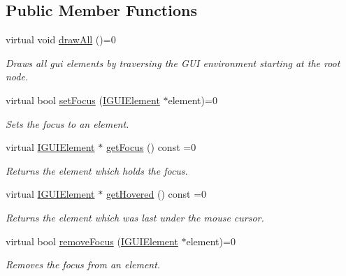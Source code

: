 \subsection*{Public Member Functions}
\begin{DoxyCompactItemize}
\item 
\mbox{\label{classirr_1_1gui_1_1IGUIEnvironment_aa6ba29bbf3121a5954cfa5a9ca72982f}} 
virtual void \hyperlink{classirr_1_1gui_1_1IGUIEnvironment_aa6ba29bbf3121a5954cfa5a9ca72982f}{draw\+All} ()=0
\begin{DoxyCompactList}\small\item\em Draws all gui elements by traversing the G\+UI environment starting at the root node. \end{DoxyCompactList}\item 
virtual bool \hyperlink{classirr_1_1gui_1_1IGUIEnvironment_a2bfe9985ae1a2f379e708fce86902cea}{set\+Focus} (\hyperlink{classirr_1_1gui_1_1IGUIElement}{I\+G\+U\+I\+Element} $\ast$element)=0
\begin{DoxyCompactList}\small\item\em Sets the focus to an element. \end{DoxyCompactList}\item 
virtual \hyperlink{classirr_1_1gui_1_1IGUIElement}{I\+G\+U\+I\+Element} $\ast$ \hyperlink{classirr_1_1gui_1_1IGUIEnvironment_a624c047cb88a5d3e3e0d17a42a627335}{get\+Focus} () const =0
\begin{DoxyCompactList}\small\item\em Returns the element which holds the focus. \end{DoxyCompactList}\item 
virtual \hyperlink{classirr_1_1gui_1_1IGUIElement}{I\+G\+U\+I\+Element} $\ast$ \hyperlink{classirr_1_1gui_1_1IGUIEnvironment_a00fa645d517a276553b78fc1d0e78591}{get\+Hovered} () const =0
\begin{DoxyCompactList}\small\item\em Returns the element which was last under the mouse cursor. \end{DoxyCompactList}\item 
virtual bool \hyperlink{classirr_1_1gui_1_1IGUIEnvironment_ab2100753b415a9950d95572d4623bf46}{remove\+Focus} (\hyperlink{classirr_1_1gui_1_1IGUIElement}{I\+G\+U\+I\+Element} $\ast$element)=0
\begin{DoxyCompactList}\small\item\em Removes the focus from an element. \end{DoxyCompactList}\item 

\end{DoxyCompactItemize}
